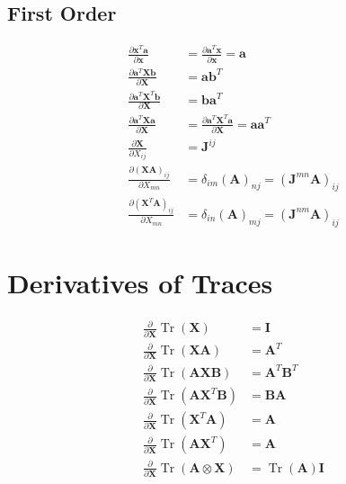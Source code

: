 \subsection{First Order}




\begin{equation} \begin{aligned} \frac{\partial \mathbf{x}^{T} \mathbf{a}}{\partial \mathbf{x}} &=\frac{\partial \mathbf{a}^{T} \mathbf{x}}{\partial \mathbf{x}}=\mathbf{a} \\ \frac{\partial \mathbf{a}^{T} \mathbf{X} \mathbf{b}}{\partial \mathbf{X}} &=\mathbf{a b}^{T} \\ \frac{\partial \mathbf{a}^{T} \mathbf{X}^{T} \mathbf{b}}{\partial \mathbf{X}} &=\mathbf{b a}^{T} \\ \frac{\partial \mathbf{a}^{T} \mathbf{X} \mathbf{a}}{\partial \mathbf{X}} &=\frac{\partial \mathbf{a}^{T} \mathbf{X}^{T} \mathbf{a}}{\partial \mathbf{X}}=\mathbf{a a}^{T} \\ \frac{\partial \mathbf{X}}{\partial X_{i j}} &=\mathbf{J}^{i j} \\ \frac{\partial(\mathbf{X} \mathbf{A})_{i j}}{\partial X_{m n}} &=\delta_{i m}(\mathbf{A})_{n j}=\left(\mathbf{J}^{m n} \mathbf{A}\right)_{i j} \\ \frac{\partial\left(\mathbf{X}^{T} \mathbf{A}\right)_{i j}}{\partial X_{m n}} &=\delta_{i n}(\mathbf{A})_{m j}=\left(\mathbf{J}^{n m} \mathbf{A}\right)_{i j} \end{aligned} \end{equation}

\section{Derivatives of Traces}

\begin{equation} \begin{aligned} \frac{\partial}{\partial \mathbf{X}} \operatorname{Tr}(\mathbf{X}) &=\mathbf{I} \\ \frac{\partial}{\partial \mathbf{X}} \operatorname{Tr}(\mathbf{X} \mathbf{A}) &=\mathbf{A}^{T} \\ \frac{\partial}{\partial \mathbf{X}} \operatorname{Tr}(\mathbf{A X B}) &=\mathbf{A}^{T} \mathbf{B}^{T} \\ \frac{\partial}{\partial \mathbf{X}} \operatorname{Tr}\left(\mathbf{A X}^{T} \mathbf{B}\right) &=\mathbf{B} \mathbf{A} \\ \frac{\partial}{\partial \mathbf{X}} \operatorname{Tr}\left(\mathbf{X}^{T} \mathbf{A}\right) &=\mathbf{A} \\ \frac{\partial}{\partial \mathbf{X}} \operatorname{Tr}\left(\mathbf{A X}^{T}\right) &=\mathbf{A} \\ \frac{\partial}{\partial \mathbf{X}} \operatorname{Tr}(\mathbf{A} \otimes \mathbf{X}) &=\operatorname{Tr}(\mathbf{A}) \mathbf{I} \end{aligned} \end{equation}

